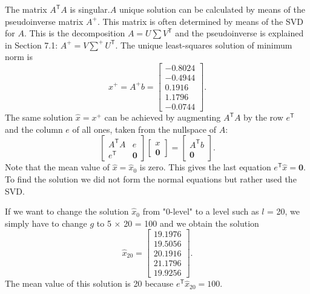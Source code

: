 The matrix $A^\mathsf{T}A$ is singular.$A$ unique solution can be calculated by means of the pseudoinverse matrix $A^\mathsf{+}$. This matrix is often determined by means of the SVD for $A$. This is the decomposition $A = U\sum V^\mathsf{T}$ and the pseudoinverse is explained in Section 7.1: $A^+ = V\sum^{+}U^\mathsf{T}$. The unique least-squares solution of minimum norm is
\begin{equation*}
	x^+
	= A^{+}b
	=
	\begin{bmatrix}
		-0.8024\\
		-0.4944\\
		0.1916\\
		1.1796\\
		-0.0744
	\end{bmatrix}.
\end{equation*}
The same solution $\hat{x} = x^{+}$ can be achieved by augmenting $A^\mathsf{T}A$ by the row $e^\mathsf{T}$ and the
column $e$ of all ones, taken from the nullspace of $A$:
\begin{equation*}
	\begin{bmatrix}
		A^\mathsf{T}A & e \\
		e^\mathsf{T} & \mathbf{0}
	\end{bmatrix}
	\begin{bmatrix}
		x\\
		\mathbf{0}
	\end{bmatrix}
	=
	\begin{bmatrix}
		A^\mathsf{T}b \\
		\mathbf{0}
	\end{bmatrix}.
\end{equation*}
Note that the mean value of $\hat{x} = \hat{x}_{0}$ is zero. This gives the last equation $e^\mathsf{T}\hat{x} = \mathbf{0}$. To find the solution we did not form the normal equations but rather used the SVD.
\par
If we want to change the solution $\hat{x}_{0}$ from "0-level" to a level such as $l$ = 20, we simply have to change $g$ to 5 $\times$ 20 = 100 and we obtain the solution
\begin{equation*}
	\hat{x}_{20}
	=     \begin{bmatrix}
		19.1976\\
		19.5056\\
		20.1916\\
		21.1796\\
		19.9256
	\end{bmatrix}.
\end{equation*}
The mean value of this solution is 20 because $e^\mathsf{T}\hat{x}_{20} = 100$.
